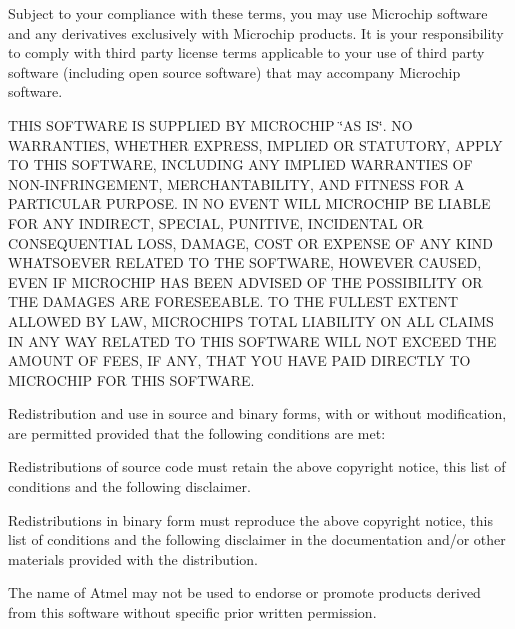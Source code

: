 Subject to your compliance with these terms, you may use Microchip software and any derivatives exclusively with Microchip products. It is your responsibility to comply with third party license terms applicable to your use of third party software (including open source software) that may accompany Microchip software.

T\+H\+IS S\+O\+F\+T\+W\+A\+RE IS S\+U\+P\+P\+L\+I\+ED BY M\+I\+C\+R\+O\+C\+H\+IP \char`\"{}\+A\+S I\+S\char`\"{}. NO W\+A\+R\+R\+A\+N\+T\+I\+ES, W\+H\+E\+T\+H\+ER E\+X\+P\+R\+E\+SS, I\+M\+P\+L\+I\+ED OR S\+T\+A\+T\+U\+T\+O\+RY, A\+P\+P\+LY TO T\+H\+IS S\+O\+F\+T\+W\+A\+RE, I\+N\+C\+L\+U\+D\+I\+NG A\+NY I\+M\+P\+L\+I\+ED W\+A\+R\+R\+A\+N\+T\+I\+ES OF N\+O\+N-\/\+I\+N\+F\+R\+I\+N\+G\+E\+M\+E\+NT, M\+E\+R\+C\+H\+A\+N\+T\+A\+B\+I\+L\+I\+TY, A\+ND F\+I\+T\+N\+E\+SS F\+OR A P\+A\+R\+T\+I\+C\+U\+L\+AR P\+U\+R\+P\+O\+SE. IN NO E\+V\+E\+NT W\+I\+LL M\+I\+C\+R\+O\+C\+H\+IP BE L\+I\+A\+B\+LE F\+OR A\+NY I\+N\+D\+I\+R\+E\+CT, S\+P\+E\+C\+I\+AL, P\+U\+N\+I\+T\+I\+VE, I\+N\+C\+I\+D\+E\+N\+T\+AL OR C\+O\+N\+S\+E\+Q\+U\+E\+N\+T\+I\+AL L\+O\+SS, D\+A\+M\+A\+GE, C\+O\+ST OR E\+X\+P\+E\+N\+SE OF A\+NY K\+I\+ND W\+H\+A\+T\+S\+O\+E\+V\+ER R\+E\+L\+A\+T\+ED TO T\+HE S\+O\+F\+T\+W\+A\+RE, H\+O\+W\+E\+V\+ER C\+A\+U\+S\+ED, E\+V\+EN IF M\+I\+C\+R\+O\+C\+H\+IP H\+AS B\+E\+EN A\+D\+V\+I\+S\+ED OF T\+HE P\+O\+S\+S\+I\+B\+I\+L\+I\+TY OR T\+HE D\+A\+M\+A\+G\+ES A\+RE F\+O\+R\+E\+S\+E\+E\+A\+B\+LE. TO T\+HE F\+U\+L\+L\+E\+ST E\+X\+T\+E\+NT A\+L\+L\+O\+W\+ED BY L\+AW, M\+I\+C\+R\+O\+C\+H\+IP\textquotesingle{}S T\+O\+T\+AL L\+I\+A\+B\+I\+L\+I\+TY ON A\+LL C\+L\+A\+I\+MS IN A\+NY W\+AY R\+E\+L\+A\+T\+ED TO T\+H\+IS S\+O\+F\+T\+W\+A\+RE W\+I\+LL N\+OT E\+X\+C\+E\+ED T\+HE A\+M\+O\+U\+NT OF F\+E\+ES, IF A\+NY, T\+H\+AT Y\+OU H\+A\+VE P\+A\+ID D\+I\+R\+E\+C\+T\+LY TO M\+I\+C\+R\+O\+C\+H\+IP F\+OR T\+H\+IS S\+O\+F\+T\+W\+A\+RE.

Redistribution and use in source and binary forms, with or without modification, are permitted provided that the following conditions are met\+:


\begin{DoxyEnumerate}
\item Redistributions of source code must retain the above copyright notice, this list of conditions and the following disclaimer.
\item Redistributions in binary form must reproduce the above copyright notice, this list of conditions and the following disclaimer in the documentation and/or other materials provided with the distribution.
\item The name of Atmel may not be used to endorse or promote products derived from this software without specific prior written permission.
\end{DoxyEnumerate}

